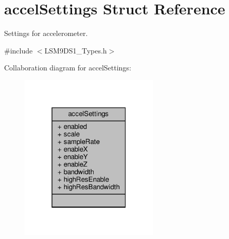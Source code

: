 \hypertarget{structaccelSettings}{}\section{accel\+Settings Struct Reference}
\label{structaccelSettings}


Settings for accelerometer.  




{\ttfamily \#include $<$L\+S\+M9\+D\+S1\+\_\+\+Types.\+h$>$}



Collaboration diagram for accel\+Settings\+:\nopagebreak
\begin{figure}[H]
\begin{center}
\leavevmode
\includegraphics[width=187pt]{structaccelSettings__coll__graph}
\end{center}
\end{figure}

